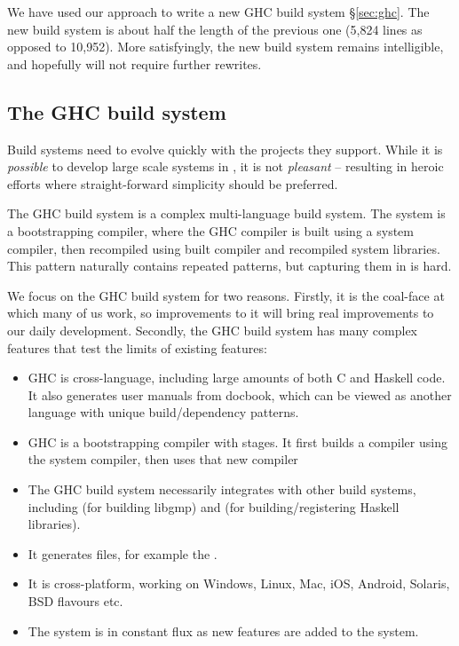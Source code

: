 We have used our approach to write a new GHC build system \S\ref{sec:ghc}. The new build system is about half the length of the previous one (5,824 lines as opposed to 10,952).  More satisfyingly, the new build system remains intelligible, and hopefully will not require further rewrites.

\subsection{The GHC build system}


Build systems need to evolve quickly with the projects they support. While it is \textit{possible} to develop large scale systems in \make, it is not \textit{pleasant} -- resulting in heroic efforts where straight-forward simplicity should be preferred.

The GHC build system is a complex multi-language build system. The system is a bootstrapping compiler, where the GHC compiler is built using a system compiler, then recompiled using built compiler and recompiled system libraries. This pattern naturally contains repeated patterns, but capturing them in \make{} is hard.

We focus on the GHC build system for two reasons. Firstly, it is the coal-face at which many of us work, so improvements to it will bring real improvements to our daily development. Secondly, the GHC build system has many complex features that test the limits of existing features:

\begin{itemize}
\item GHC is cross-language, including large amounts of both C and Haskell code. It also generates user manuals from docbook, which can be viewed as another language with unique build/dependency patterns.
\item GHC is a bootstrapping compiler with stages. It first builds a compiler using the system compiler, then uses that new compiler
\item The GHC build system necessarily integrates with other build systems, including \make{} (for building libgmp) and \cabal{} (for building/registering Haskell libraries).
\item It generates files, for example the .
\item It is cross-platform, working on Windows, Linux, Mac, iOS, Android, Solaris, BSD flavours etc.
\item The system is in constant flux as new features are added to the system.
\end{itemize}

